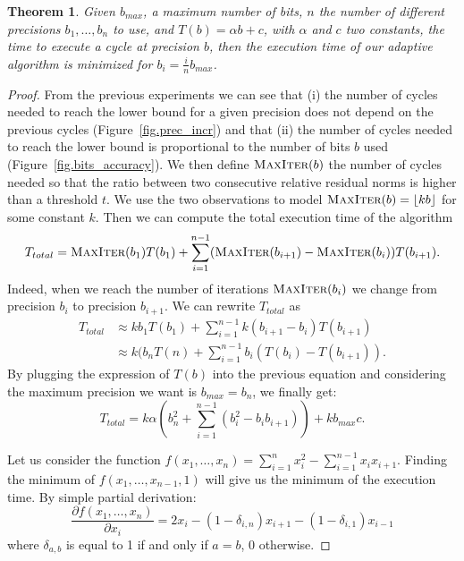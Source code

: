\documentclass[sigplan]{acmart}
\newtheorem{theorem}{Theorem}
\begin{document}
   \begin{theorem}
     Given $b_{max}$, a maximum number of bits, $n$ the number of different precisions $b_1,\dots,b_n$ to use, and $T(b)=\alpha b+c$, with $\alpha$ and $c$ two constants, the time to execute a cycle at precision $b$, then
     the execution time of our adaptive algorithm is minimized for $b_i = \frac{i}{n}b_{max}$.
   \end{theorem}

   \begin{proof}
   From the previous experiments we can see that (i) the number of cycles needed to reach the lower bound for a given precision does not depend on the previous cycles (Figure~\ref{fig.prec_incr}) and that (ii) the number of cycles
   needed to reach the lower bound is proportional to the number of bits $b$ used (Figure~\ref{fig.bits_accuracy}). We then define $\textsc{MaxIter}(b)$ the number of cycles needed so that the ratio between two consecutive
   relative residual norms is higher than a threshold $t$. We use the two observations to model $\textsc{MaxIter}(b) = \lfloor kb \rfloor$ for some constant $k$.
   Then we can compute the total execution time of the algorithm \[T_{total} = \textsc{MaxIter}(b_1)T(b_1) + \sum\limits_{i=1}^{n-1} (\textsc{MaxIter}(b_{i+1})-\textsc{MaxIter}(b_i))T(b_{i+1}). \]
   Indeed, when we reach the number of iterations $\textsc{MaxIter}(b_i)$ we change from precision $b_i$ to precision $b_{i+1}$.
   We can rewrite $T_{total}$ as
   \begin{align*}
    T_{total} &\approx k b_{1} T(b_1) + \sum\limits_{i=1}^{n-1} k(b_{i+1}-b_{i})T(b_{i+1})\\
	    & \approx k ( b_{n}T(n) + \sum\limits_{i=1}^{n-1} b_i ( T(b_i) - T(b_{i+1})).
   \end{align*}
   By plugging the expression of $T(b)$ into the previous equation and considering the maximum precision we want is $b_{max}=b_n$, we finally get:
   \begin{equation}
    T_{total}  = k\alpha\left(b_n^2 + \sum\limits_{i=1}^{n-1} (b_i^2 - b_i b_{i+1})\right) + kb_{max}c.
   \end{equation}
   
   Let us consider the function $f(x_1,\dots,x_n) = \sum\limits_{i=1}^n x_i^2 - \sum\limits_{i=1}^{n-1} x_ix_{i+1}$. Finding the minimum of $f(x_1,\dots,x_{n-1},1)$ will give
   us the minimum of the execution time.
   By simple partial derivation:
   \[ \frac{\partial f(x_1,\dots,x_n)}{\partial x_i} = 2x_i - (1-\delta_{i,n})x_{i+1} - (1-\delta_{i,1})x_{i-1} \]
   where $\delta_{a,b} $ is equal to 1 if and only if $a=b$, 0 otherwise.
   

\end{proof}
\end{document}
